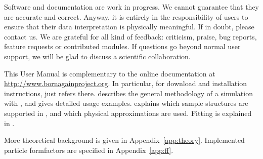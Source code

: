Software and documentation are work in progress.
We cannot guarantee that they are accurate and correct.
Anyway, it is entirely in the responsibility of users
to ensure that their data interpretation is physically meaningful.
If in doubt, please contact us.
We are grateful for all kind of feedback:
criticism, praise, bug reports, feature requests or contributed modules.
If questions go beyond normal user support,
we will be glad to discuss a scientific collaboration.

This User Manual is complementary to the online documentation
at \url{http://www.bornagainproject.org}.
In particular, for download and installation instructions,
 just refers there.
 describes
the general methodology of a simulation with \BornAgain,
and gives detailed usage examples.
 explains
which sample structures are supported in \BornAgain,
and which physical approximations are used.
Fitting is explained in .

More theoretical background is given in Appendix~\ref{app:theory}.
Implemented particle formfactors are specified in Appendix~\ref{app:ff}.
